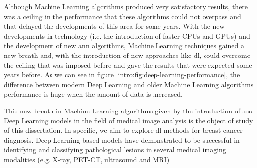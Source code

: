 \documentclass[
  twoside,
  11pt, a4paper,
  footinclude=true,
  headinclude=true,
  cleardoublepage=empty
]{scrbook}
\begin{document}
    Although Machine Learning algorithms produced very satisfactory results, there was a ceiling in the performance that these algorithms could not overpass and that delayed the developments of this area for some years. With the new developments in technology (i.e. the introduction of faster CPUs and GPUs) and the development of new \gls{ann} algorithms, Machine Learning techniques gained a new breath and, with the introduction of new approaches like \gls{dl}, could overcome the ceiling that was imposed before and gave the results that were expected some years before. As we can see in figure \ref{intro:fig:deep-learning-performance}, the difference between modern Deep Learning and older Machine Learning algorithms performance is huge when the amount of data is increased.


    This new breath in Machine Learning  algorithms given by the introduction of \gls{soa} Deep Learning  models in the field of medical image analysis is the object of study of this dissertation. In specific, we aim to explore \gls{dl} methods for breast cancer diagnosis. Deep Learning-based models have demonstrated to be successful in identifying and classifying pathological lesions in several medical imaging modalities (e.g. X-ray, PET-CT, ultrasound and MRI)
\end{document}

